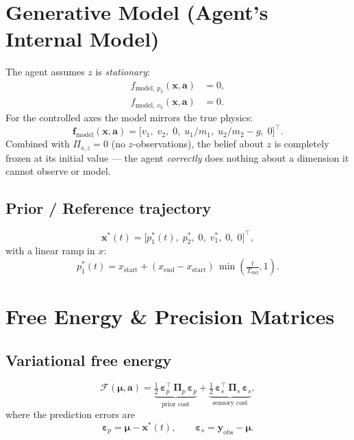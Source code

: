 \documentclass[11pt, a4paper]{article}
\newcommand{\vect}[1]{\bm{#1}}
\newcommand{\mat}[1]{\mathbf{#1}}
\newcommand{\FE}{\mathcal{F}}
\newcommand{\Pip}{\mat{\Pi}_p}
\newcommand{\Pis}{\mat{\Pi}_s}
\newcommand{\epsp}{\vect{\varepsilon}_p}
\newcommand{\epss}{\vect{\varepsilon}_s}
\begin{document}
\section{Generative Model (Agent's Internal Model)}
\label{sec:gm}

The agent assumes $z$ is \emph{stationary}:
\begin{align}
  f_{\text{model},\,p_3}(\vect{x},\vect{a}) &= 0, \\
  f_{\text{model},\,v_3}(\vect{x},\vect{a}) &= 0.
\end{align}
For the controlled axes the model mirrors the true physics:
\begin{equation}
  \vect{f}_{\text{model}}(\vect{x},\vect{a})
  = \bigl[v_1,\;v_2,\;0,\;u_1/m_1,\;u_2/m_2 - g,\;0\bigr]^\top.
\end{equation}
Combined with $\Pi_{s,z}=0$ (no $z$-observations), the belief about $z$
is completely frozen at its initial value --- the agent \emph{correctly} does
nothing about a dimension it cannot observe or model.

\subsection{Prior / Reference trajectory}
\begin{equation}
  \vect{x}^*(t) = \bigl[p_1^*(t),\;p_2^*,\;0,\;v_1^*,\;0,\;0\bigr]^\top,
\end{equation}
with a linear ramp in $x$:
\begin{equation}
  p_1^*(t) = x_{\text{start}} + (x_{\text{end}} - x_{\text{start}})\,
             \min\!\left(\tfrac{t}{T_{\text{end}}},1\right).
\end{equation}

\section{Free Energy \& Precision Matrices}
\label{sec:fe}

\subsection{Variational free energy}
\begin{equation}
  \FE(\vect{\mu}, \vect{a}) = \underbrace{\tfrac{1}{2}\,\epsp^\top\,\Pip\,\epsp}_{\text{prior cost}}
                            + \underbrace{\tfrac{1}{2}\,\epss^\top\,\Pis\,\epss}_{\text{sensory cost}},
\end{equation}
where the prediction errors are
\begin{equation}
  \epsp = \vect{\mu} - \vect{x}^*(t), \qquad
  \epss = \vect{y}_{\text{obs}} - \vect{\mu}.
\end{equation}
\end{document}
